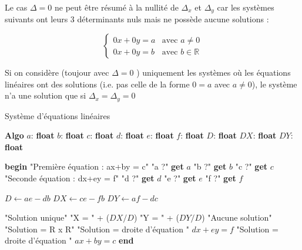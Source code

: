 \documentclass[a4paper,10pt]{report}
\begin{document}
Le cas $\Delta = 0$ ne peut être résumé à la nullité de $\Delta_x$ et $\Delta_y$ car les systèmes suivants
ont leurs 3 déterminants nuls mais ne possède aucune solutions :

\begin{displaymath}
	\begin{cases}
		0x + 0y = a & \text{avec } a \neq 0 \\
		0x + 0y = b & \text{avec } b \in \mathbb{R}
	\end{cases}
\end{displaymath}

Si on considère (toujour avec $\Delta = 0$ ) uniquement les systèmes où les équations linéaires ont des solutions 
(i.e. pas celle de la forme $0=a$ avec $a\neq 0$), le système n'a une solution que si $\Delta_x = \Delta_y = 0$ 


\begin{algorithm}
	\caption{Système d'équations linéaires}
	\begin{algorithmic}
		\STATE \textbf{Algo}
			\STATE $a$: \textbf{float}
			\STATE $b$: \textbf{float}
			\STATE $c$: \textbf{float}
			\STATE $d$: \textbf{float}
			\STATE $e$: \textbf{float}
			\STATE $f$: \textbf{float}
			\STATE $D$: \textbf{float}
			\STATE $DX$: \textbf{float}
			\STATE $DY$: \textbf{float}
			
		\STATE \textbf{begin}
		\PRINT "Première équation : ax+by = c"
		\PRINT "a ?"
		\STATE \textbf{get} $a$
		\PRINT "b ?"
		\STATE \textbf{get} $b$
		\PRINT "c ?"
		\STATE \textbf{get} $c$
		\PRINT "Seconde équation : dx+ey = f"
		\PRINT "d ?"
		\STATE \textbf{get} $d$
		\PRINT "e ?"
		\STATE \textbf{get} $e$
		\PRINT "f ?"
		\STATE \textbf{get} $f$
		
		\STATE $D \leftarrow ae-db$ 
		\STATE $DX \leftarrow ce-fb$
		\STATE $DY \leftarrow af-dc$
		
			\PRINT "Solution unique"
			\PRINT "X = " + ($DX / D$)
			\PRINT "Y = " + ($DY / D$)
			\PRINT "Aucune solution"
				\PRINT "Solution = R x R"
			\ELSE
				\PRINT "Solution = droite d'équation " $dx + ey =f$
			\ENDIF
		\ELSE
			\PRINT "Solution = droite d'équation " $ax + by =c$
		\ENDIF
		\STATE \textbf{end}
	\end{algorithmic}
\end{algorithm}
\end{document}
